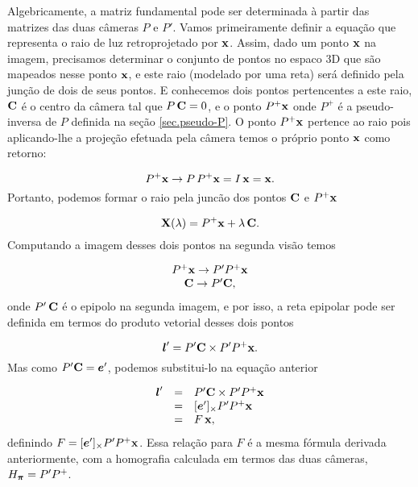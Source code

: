 Algebricamente, a matriz fundamental pode ser determinada à partir das matrizes das duas câmeras $P$ e $P'$. Vamos primeiramente definir a equação que representa o raio de luz retroprojetado por $\mathbf{x}$. Assim, dado um ponto $\mathbf{x}$ na imagem, precisamos determinar o conjunto de pontos no espaco 3D que são mapeados nesse ponto $\mathbf{x}$, e este raio (modelado por uma reta) será definido pela junção de dois de seus pontos. E conhecemos dois pontos pertencentes a este raio, ${\bf C}$ é o centro da câmera tal que $P\,{\bf C}=0$, e o ponto $P^+\mathbf{x}$ onde $P^+$ é a pseudo-inversa de $P$ definida na seção \ref{sec.pseudo-P}. O ponto $P^+\mathbf{x}$ pertence ao raio pois aplicando-lhe a projeção efetuada pela câmera temos o próprio ponto $\mathbf{x}$ como retorno:

\begin{equation*}
P^+\mathbf{x} \rightarrow P\,P^+\mathbf{x}=I\,\mathbf{x}=\mathbf{x}.
\end{equation*}
Portanto, podemos formar o raio pela juncão dos pontos ${\bf C}$ e $P^+\mathbf{x}$

\begin{equation*}
\mathbf{X}(\lambda)=P^+\mathbf{x}+\lambda\,{\bf C}.
\end{equation*}
Computando a imagem desses dois pontos na segunda visão temos

\begin{equation*}
\begin{array}{c}
P^+\mathbf{x} \rightarrow P'P^+\mathbf{x}\\
{\bf C} \rightarrow P'{\bf C},
\end{array}
\end{equation*}
onde $P'\,{\bf C}$ é o epipolo na segunda imagem, e por isso, a reta epipolar pode ser definida em termos do produto vetorial desses dois pontos

\begin{equation*}
\boldsymbol{l}'=P'{\bf C} \times P'P^+\mathbf{x}.
\end{equation*}
Mas como $P'{\bf C}=\boldsymbol{e}'$, podemos substitui-lo na equação anterior

\begin{equation*}
\begin{array}{rcl}
\boldsymbol{l}'&=&P'{\bf C} \times P'P^+\mathbf{x}\\
&=&[\boldsymbol{e}']_\times P'P^+\mathbf{x}\\
&=&F\,\mathbf{x},
\end{array}
\end{equation*}
definindo $F=[\boldsymbol{e}']_\times P'P^+\mathbf{x}$. Essa relação para $F$ é a mesma fórmula derivada anteriormente, com a homografia calculada em termos das duas câmeras, $H_{\boldsymbol{\pi}}=P'P^+$.


